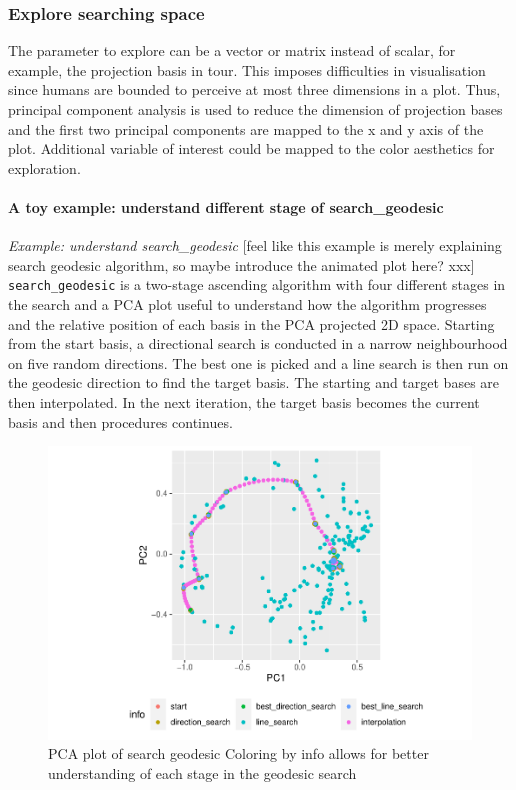 \documentclass[12pt]{article}
\begin{document}
\hypertarget{animated}{%
\subsubsection{Explore searching space}\label{animated}}

The parameter to explore can be a vector or matrix instead of scalar,
for example, the projection basis in tour. This imposes difficulties in
visualisation since humans are bounded to perceive at most three
dimensions in a plot. Thus, principal component analysis is used to
reduce the dimension of projection bases and the first two principal
components are mapped to the x and y axis of the plot. Additional
variable of interest could be mapped to the color aesthetics for
exploration.

\hypertarget{a-toy-example-understand-different-stage-of-search_geodesic}{%
\paragraph{A toy example: understand different stage of
search\_geodesic}\label{a-toy-example-understand-different-stage-of-search_geodesic}}

\emph{Example: understand search\_geodesic} {[}feel like this example is
merely explaining search geodesic algorithm, so maybe introduce the
animated plot here? xxx{]} \texttt{search\_geodesic} is a two-stage
ascending algorithm with four different stages in the search and a PCA
plot useful to understand how the algorithm progresses and the relative
position of each basis in the PCA projected 2D space. Starting from the
start basis, a directional search is conducted in a narrow neighbourhood
on five random directions. The best one is picked and a line search is
then run on the geodesic direction to find the target basis. The
starting and target bases are then interpolated. In the next iteration,
the target basis becomes the current basis and then procedures
continues.

\begin{figure}
\centering
\includegraphics{paper_files/figure-latex/pca-1.pdf}
\caption{\label{pca}PCA plot of search geodesic Coloring by info allows
for better understanding of each stage in the geodesic search}
\end{figure}
\end{document}
